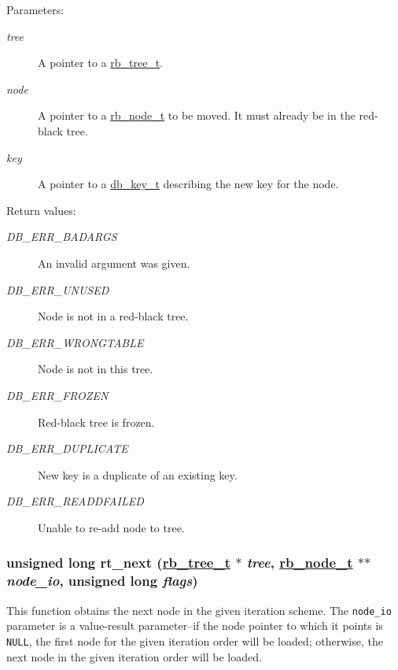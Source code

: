 \begin{Desc}
\item[Parameters:]
\begin{description}
\item[{\em tree}]A pointer to a \hyperlink{group__dbprim__rbtree_a0}{rb\_\-tree\_\-t}. \item[{\em node}]A pointer to a \hyperlink{group__dbprim__rbtree_a1}{rb\_\-node\_\-t} to be moved. It must already be in the red-black tree. \item[{\em key}]A pointer to a \hyperlink{group__dbprim_a0}{db\_\-key\_\-t} describing the new key for the node.\end{description}
\end{Desc}
\begin{Desc}
\item[Return values:]
\begin{description}
\item[{\em DB\_\-ERR\_\-BADARGS}]An invalid argument was given. \item[{\em DB\_\-ERR\_\-UNUSED}]Node is not in a red-black tree. \item[{\em DB\_\-ERR\_\-WRONGTABLE}]Node is not in this tree. \item[{\em DB\_\-ERR\_\-FROZEN}]Red-black tree is frozen. \item[{\em DB\_\-ERR\_\-DUPLICATE}]New key is a duplicate of an existing key. \item[{\em DB\_\-ERR\_\-READDFAILED}]Unable to re-add node to tree. \end{description}
\end{Desc}
\hypertarget{group__dbprim__rbtree_a10}{
\subsubsection[rt\_\-next]{\setlength{\rightskip}{0pt plus 5cm}unsigned long rt\_\-next (\hyperlink{dbprim_8h_a0}{rb\_\-tree\_\-t} $\ast$ {\em tree}, \hyperlink{dbprim_8h_a1}{rb\_\-node\_\-t} $\ast$$\ast$ {\em node\_\-io}, unsigned long {\em flags})}}
\label{group__dbprim__rbtree_a10}


This function obtains the next node in the given iteration scheme. The {\tt node\_\-io} parameter is a value-result parameter--if the node pointer to which it points is {\tt NULL}, the first node for the given iteration order will be loaded; otherwise, the next node in the given iteration order will be loaded.

